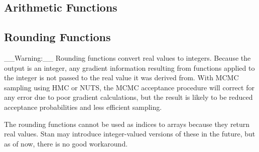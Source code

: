 \begin{description}
\begin{description}
\begin{description}
\begin{description}
\begin{description}
\begin{description}
\begin{description}
\begin{description}
\begin{description}
\begin{description}
\begin{description}
\begin{description}
\begin{description}
\begin{description}
\begin{description}   %



\subsection{Arithmetic Functions}

\begin{description}   %



\subsection{Rounding Functions}

__Warning:__ Rounding functions convert real values to integers. Because the output is an integer, any gradient information resulting from functions applied to the integer is not passed to the real value it was derived from.  With MCMC sampling using HMC or NUTS, the MCMC acceptance procedure will correct for any error due to poor gradient calculations, but the result is likely to be reduced acceptance probabilities and less efficient sampling.

The rounding functions cannot be used as indices to arrays because they return real values.  Stan may introduce integer-valued versions of these in the future, but as of now, there is no good workaround.


\end{description}
\end{description}
\end{description}
\end{description}
\end{description}
\end{description}
\end{description}
\end{description}
\end{description}
\end{description}
\end{description}
\end{description}
\end{description}
\end{description}
\end{description}
\end{description}
